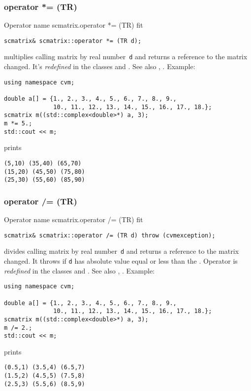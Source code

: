 \subsubsection{operator *= (TR)}
Operator%
\pdfdest name {scmatrix.operator *= (TR)} fit
\begin{verbatim}
scmatrix& scmatrix::operator *= (TR d);
\end{verbatim}
multiplies  calling matrix by  real number~\verb"d"
and returns a reference to
the matrix changed.
It's \emph{redefined} in the classes
and .
See also ,
.
Example:
\begin{Verbatim}
using namespace cvm;

double a[] = {1., 2., 3., 4., 5., 6., 7., 8., 9.,
              10., 11., 12., 13., 14., 15., 16., 17., 18.};
scmatrix m((std::complex<double>*) a, 3);
m *= 5.;
std::cout << m;
\end{Verbatim}
prints
\begin{Verbatim}
(5,10) (35,40) (65,70)
(15,20) (45,50) (75,80)
(25,30) (55,60) (85,90)
\end{Verbatim}
\newpage



\subsubsection{operator /= (TR)}
Operator%
\pdfdest name {scmatrix.operator /= (TR)} fit
\begin{verbatim}
scmatrix& scmatrix::operator /= (TR d) throw (cvmexception);
\end{verbatim}
divides  calling matrix by  real number~\verb"d"
and returns a reference to
the matrix changed.
It throws  
if \verb"d" has  absolute value equal or less
than the 
.
Operator is \emph{redefined} in the classes
and .
See also ,
.
Example:
\begin{Verbatim}
using namespace cvm;

double a[] = {1., 2., 3., 4., 5., 6., 7., 8., 9.,
              10., 11., 12., 13., 14., 15., 16., 17., 18.};
scmatrix m((std::complex<double>*) a, 3);
m /= 2.;
std::cout << m;
\end{Verbatim}
prints
\begin{Verbatim}
(0.5,1) (3.5,4) (6.5,7)
(1.5,2) (4.5,5) (7.5,8)
(2.5,3) (5.5,6) (8.5,9)
\end{Verbatim}
\newpage




